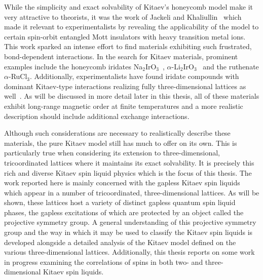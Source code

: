 While the simplicity and exact solvability of Kitaev's honeycomb model make it very attractive to theorists, it was the work of Jackeli and Khaliullin~\cite{JackeliPRL2009} which made it relevant to experimentalists by revealing the applicability of the model to certain spin-orbit entangled Mott insulators with heavy transition metal ions.
This work sparked an intense effort to find materials exhibiting such frustrated, bond-dependent interactions.
In the search for Kitaev materials, prominent examples include the honeycomb iridates Na$_2$IrO$_3$~\cite{SinghPRB2010}, $\alpha$-Li$_2$IrO$_3$~\cite{KobayashiJMC2003,SinghPRL2012} and the ruthenate $\alpha$-RuCl$_3$.
Additionally, experimentalists have found iridate compounds with dominant Kitaev-type interactions realizing fully three-dimensional lattices as well~\cite{TakayamaPRL2015,LeePRB2015,KimEPL2015,LeePRB2016,KatukuriSP2016,ModicNatComm2014,BiffinPRL2014,KimchiPRB2014}.
As will be discussed in more detail later in this thesis, all of these materials exhibit long-range magnetic order at finite temperatures and a more realistic description should include additional exchange interactions.

Although such considerations are necessary to realistically describe these materials, the pure Kitaev model still has much to offer on its own.
This is particularly true when considering its extension to three-dimensional, tricoordinated lattices where it maintains its exact solvability.
It is precisely this rich and diverse Kitaev spin liquid physics which is the focus of this thesis.
The work reported here is mainly concerned with the gapless Kitaev spin liquids which appear in a number of tricoordinated, three-dimensional lattices.
As will be shown, these lattices host a variety of distinct gapless quantum spin liquid phases, the gapless excitations of which are protected by an object called the projective symmetry group.
A general understanding of this projective symmetry group and the way in which it may be used to classify the Kitaev spin liquids is developed alongside a detailed analysis of the Kitaev model defined on the various three-dimensional lattices.
Additionally, this thesis reports on some work in progress examining the correlations of spins in both two- and three-dimensional Kitaev spin liquids.

